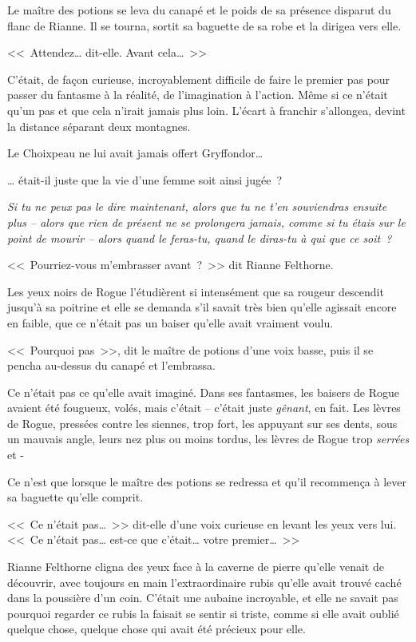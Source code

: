 Le maître des potions se leva du canapé et le poids de sa présence disparut du flanc de Rianne. Il se tourna, sortit sa baguette de sa robe et la dirigea vers elle.

<<~Attendez… dit-elle. Avant cela…~>>

C'était, de façon curieuse, incroyablement difficile de faire le premier pas pour passer du fantasme à la réalité, de l'imagination à l'action. Même si ce n'était qu'un pas et que cela n'irait jamais plus loin. L'écart à franchir s'allongea, devint la distance séparant deux montagnes.

Le Choixpeau ne lui avait jamais offert Gryffondor…

… était-il juste que la vie d'une femme soit ainsi jugée~?

\emph{Si tu ne peux pas le dire maintenant, alors que tu ne t'en souviendras ensuite plus -- alors que rien de présent ne se prolongera jamais, comme si tu étais sur le point de mourir -- alors quand le feras-tu, quand le diras-tu à qui que ce soit~?}

<<~Pourriez-vous m'embrasser avant~?~>> dit Rianne Felthorne.

Les yeux noirs de Rogue l'étudièrent si intensément que sa rougeur descendit jusqu'à sa poitrine et elle se demanda s'il savait très bien qu'elle agissait encore en faible, que ce n'était pas un baiser qu'elle avait vraiment voulu.

<<~Pourquoi pas~>>, dit le maître de potions d'une voix basse, puis il se pencha au-dessus du canapé et l'embrassa.

Ce n'était pas ce qu'elle avait imaginé. Dans ses fantasmes, les baisers de Rogue avaient été fougueux, volés, mais c'était -- c'était juste \emph{gênant}, en fait. Les lèvres de Rogue, pressées contre les siennes, trop fort, les appuyant sur ses dents, sous un mauvais angle, leurs nez plus ou moins tordus, les lèvres de Rogue trop \emph{serrées} et -

Ce n'est que lorsque le maître des potions se redressa et qu'il recommença à lever sa baguette qu'elle comprit.

<<~Ce n'était pas…~>> dit-elle d'une voix curieuse en levant les yeux vers lui. <<~Ce n'était pas… est-ce que c'était… votre premier…~>>

Rianne Felthorne cligna des yeux face à la caverne de pierre qu'elle venait de découvrir, avec toujours en main l'extraordinaire rubis qu'elle avait trouvé caché dans la poussière d'un coin. C'était une aubaine incroyable, et elle ne savait pas pourquoi regarder ce rubis la faisait se sentir si triste, comme si elle avait oublié quelque chose, quelque chose qui avait été précieux pour elle.
